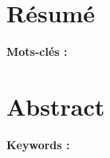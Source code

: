 \thispagestyle{empty}

\section*{Résumé}


{\bf Mots-clés :}


\section*{Abstract}



{\bf Keywords :}
